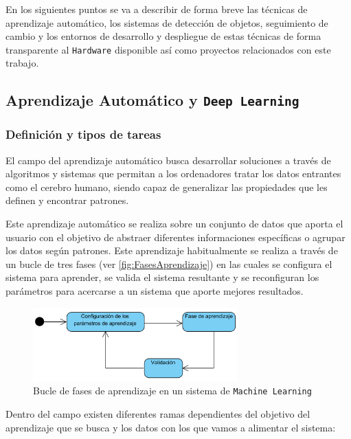 En los siguientes puntos se va a describir de forma breve las técnicas de aprendizaje automático, los sistemas de detección de objetos, seguimiento de cambio y los entornos de desarrollo y despliegue 
de estas técnicas de forma transparente al \texttt{Hardware} disponible así como proyectos relacionados con este trabajo.
\clearpage

\subsection{Aprendizaje Automático y \texttt{Deep Learning}}

\subsubsection{Definición y tipos de tareas}

El campo del aprendizaje automático busca desarrollar soluciones a través de algoritmos y sistemas que permitan a los ordenadores tratar los datos entrantes como el cerebro humano, siendo capaz de 
generalizar las propiedades que les definen y encontrar patrones.

Este aprendizaje automático se realiza sobre un conjunto de datos que aporta el usuario con el objetivo de abstraer diferentes informaciones específicas o agrupar los datos según patrones. Este aprendizaje 
habitualmente se realiza a través de un bucle de tres fases (ver \autoref{fig:FasesAprendizaje}) en las cuales se configura el sistema para aprender, se valida el sistema resultante y se reconfiguran los parámetros para acercarse a un sistema 
que aporte mejores resultados.

\begin{figure}[H]
    \centering
    \includegraphics[width=0.7\textwidth]{images/4/Fases.png}
    \caption{Bucle de fases de aprendizaje en un sistema de \texttt{Machine Learning}}
    \label{fig:FasesAprendizaje}
\end{figure}

Dentro del campo existen diferentes ramas dependientes del objetivo del aprendizaje que se busca y los datos con los que vamos a alimentar el sistema:

